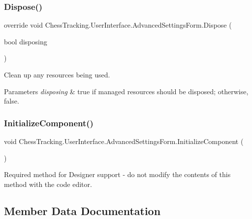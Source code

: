 \subsubsection{\texorpdfstring{Dispose()}{Dispose()}}
{\footnotesize\ttfamily override void Chess\+Tracking.\+User\+Interface.\+Advanced\+Settings\+Form.\+Dispose (\begin{DoxyParamCaption}\item[{bool}]{disposing }\end{DoxyParamCaption})\hspace{0.3cm}{\ttfamily [protected]}}



Clean up any resources being used. 


\begin{DoxyParams}{Parameters}
{\em disposing} & true if managed resources should be disposed; otherwise, false.\\
\hline
\end{DoxyParams}
\mbox{\label{class_chess_tracking_1_1_user_interface_1_1_advanced_settings_form_af97e63662ba24b5262a3c90140297020}} 
\subsubsection{\texorpdfstring{InitializeComponent()}{InitializeComponent()}}
{\footnotesize\ttfamily void Chess\+Tracking.\+User\+Interface.\+Advanced\+Settings\+Form.\+Initialize\+Component (\begin{DoxyParamCaption}{ }\end{DoxyParamCaption})\hspace{0.3cm}{\ttfamily [private]}}



Required method for Designer support -\/ do not modify the contents of this method with the code editor. 



\subsection{Member Data Documentation}
\mbox{\label{class_chess_tracking_1_1_user_interface_1_1_advanced_settings_form_a54c26d0f996bf2fb245dbffcc97f584c}} 
